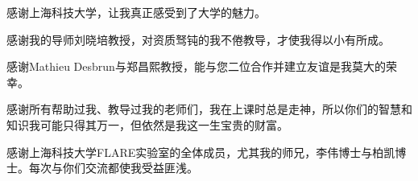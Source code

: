 \begin{acknowledgement}
    感谢上海科技大学，让我真正感受到了大学的魅力。

    感谢我的导师刘晓培教授，对资质驽钝的我不倦教导，才使我得以小有所成。

    感谢Mathieu Desbrun与郑昌熙教授，能与您二位合作并建立友谊是我莫大的荣幸。

    感谢所有帮助过我、教导过我的老师们，我在上课时总是走神，所以你们的智慧和知识我可能只得其万一，但依然是我这一生宝贵的财富。

    感谢上海科技大学FLARE实验室的全体成员，尤其我的师兄，李伟博士与柏凯博士。每次与你们交流都使我受益匪浅。
\end{acknowledgement}